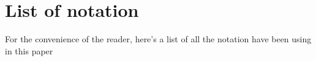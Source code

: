 \section{List of notation}
\label{sec:list-notation}

For the convenience of the reader, here's a list of all the notation have been using in this paper